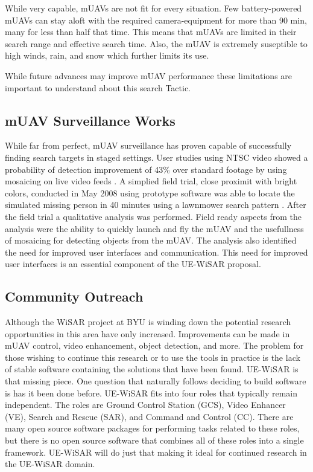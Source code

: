While very capable, mUAVs are not fit for every
situation.  Few battery-powered mUAVs can stay aloft with the required
camera-equipment for more than 90 min, many for less than half that time.  This means that mUAVs are
limited in their search range and effective search time. Also, the mUAV is
extremely suseptible to high winds, rain, and snow which further limits its use.

While future advances may improve mUAV performance
these limitations are important to understand about this search Tactic.

\subsection{mUAV Surveillance Works}
While far from perfect, mUAV surveillance has proven capable of successfully
finding search targets in staged settings.  User studies using NTSC video showed
a probability of detection improvement of 43\% over standard footage by using
mosaicing on live video feeds \cite{goodrich2008supporting}.  A simplied field
trial, close proximit with bright colors, conducted in May 2008 using prototype
software was able to locate the simulated missing person in 40 minutes using a
lawnmower search pattern \cite{goodrich2009towards}.
After the field trial a qualitative analysis was performed.  Field
ready aspects from the analysis were the ability to quickly launch and fly the
mUAV and the usefullness of mosaicing for detecting objects from the mUAV.  The
analysis also identified the need for improved user interfaces and
communication.  This need for improved user interfaces is an essential component
of the UE-WiSAR proposal.

\subsection{Community Outreach}
Although the WiSAR project at BYU is winding down the potential research
opportunities in this area have only increased.  Improvements can be made in
mUAV control, video enhancement, object detection, and more.  The problem for
those wishing to continue this research or to use the tools in practice is the
lack of stable software containing the solutions that have been found.  UE-WiSAR
is that missing piece.  One question that naturally follows deciding to build
software is has it been done before.  UE-WiSAR fits into four roles that
typically remain independent.  The roles are Ground Control Station (GCS), Video
Enhancer (VE), Search and Rescue (SAR), and Command and Control (CC).  There are
many open source software packages for performing tasks related to these roles,
but there is no open source software that combines all of these roles into a
single framework.  UE-WiSAR will do just that making it ideal for continued research in the UE-WiSAR domain.

